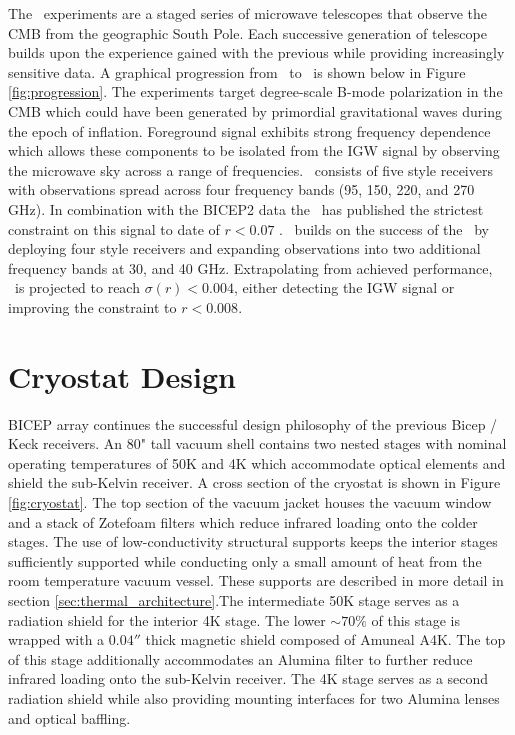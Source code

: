 \documentclass[]{spie}  %
\begin{document}
The \bk \ experiments are a staged series of microwave telescopes that observe
the CMB from the geographic South Pole. Each successive generation of
telescope builds upon the experience gained with the previous while providing
increasingly sensitive data. A graphical progression from  \ to
\biceparray \ is shown below in Figure \ref{fig:progression}. The experiments target degree-scale B-mode
polarization in the CMB which could have been generated by primordial
gravitational waves during the epoch of inflation. Foreground signal exhibits strong frequency dependence which allows these components to be isolated from the IGW
signal by observing the microwave sky across a range of frequencies.
\keckarray \ consists of five  style receivers with observations spread
across four frequency bands (95, 150, 220, and 270 GHz). In combination with the BICEP2 data the \keckarray \ has
published the strictest constraint on this signal to date of $r<0.07$
\cite{bk14}. \biceparray \ builds on the success of the \keckarray \ by
deploying four  style receivers and expanding observations into two
additional frequency bands at 30, and 40 GHz. Extrapolating from achieved performance,
\biceparray \ is projected to reach $\sigma(r)<0.004$, either detecting the IGW
signal or improving the constraint to $r<0.008$. 



	
\section{Cryostat Design}

BICEP array continues the successful design philosophy of
the previous Bicep / Keck receivers. An 80" tall vacuum shell contains two nested
stages with nominal operating temperatures of 50K and 4K which accommodate
optical elements and shield the sub-Kelvin receiver. A cross section of
the cryostat is shown in Figure \ref{fig:cryostat}. The top section of the
vacuum jacket houses the vacuum window and a stack of Zotefoam filters which reduce infrared loading
onto the colder stages. The use of low-conductivity structural supports keeps
the interior stages sufficiently supported while conducting only a small
amount of heat from the room temperature vacuum vessel. These supports are
described in more detail in section \ref{sec:thermal_architecture}.The
intermediate 50K stage serves as a radiation shield for the interior 4K stage.
The lower $\sim70\%$ of this stage is wrapped with a $0.04''$ thick magnetic
shield composed of Amuneal A4K. The top of this stage additionally
accommodates an Alumina filter to further reduce infrared loading onto the
sub-Kelvin receiver. The 4K stage serves as a second radiation shield while
also providing mounting interfaces for two Alumina lenses and optical
baffling.
\end{document}
